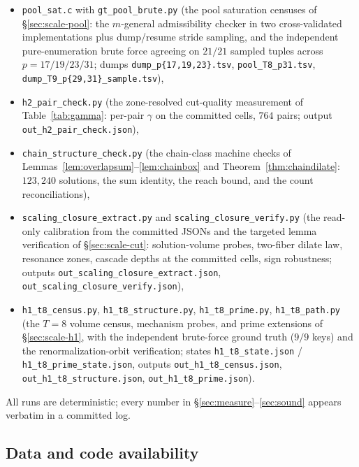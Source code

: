 \documentclass[11pt,a4paper]{article}
\numberwithin{equation}{section}
\theoremstyle{plain}
\theoremstyle{definition}
\theoremstyle{remark}
\begin{document}
\begin{itemize}[leftmargin=2.2em,itemsep=1pt,topsep=2pt]
        the two frontier cells; output
        \texttt{out\_higher\_rung\_step3.json}),
  \item \texttt{pool\_sat.c} with \texttt{gt\_pool\_brute.py} (the pool
        saturation censuses of \S\ref{sec:scale-pool}: the $m$-general
        admissibility checker in two cross-validated implementations
        plus dump/resume stride sampling, and the independent
        pure-enumeration brute force agreeing on $21/21$ sampled tuples
        across $p=17/19/23/31$; dumps
        \texttt{dump\_p\{17,19,23\}.tsv}, \texttt{pool\_T8\_p31.tsv},
        \texttt{dump\_T9\_p\{29,31\}\_sample.tsv}),
  \item \texttt{h2\_pair\_check.py} (the zone-resolved cut-quality
        measurement of Table~\ref{tab:gamma}: per-pair $\gamma$ on the
        committed cells, $764$ pairs; output
        \texttt{out\_h2\_pair\_check.json}),
  \item \texttt{chain\_structure\_check.py} (the chain-class machine
        checks of Lemmas~\ref{lem:overlapsum}--\ref{lem:chainbox} and
        Theorem~\ref{thm:chaindilate}: $123{,}240$ solutions, the sum
        identity, the reach bound, and the count reconciliations),
  \item \texttt{scaling\_closure\_extract.py} and
        \texttt{scaling\_closure\_verify.py} (the read-only calibration
        from the committed JSONs and the targeted lemma verification of
        \S\ref{sec:scale-cut}: solution-volume probes, two-fiber dilate
        law, resonance zones, cascade depths at the committed cells,
        sign robustness; outputs
        \texttt{out\_scaling\_closure\_extract.json},
        \texttt{out\_scaling\_closure\_verify.json}),
  \item \texttt{h1\_t8\_census.py}, \texttt{h1\_t8\_structure.py},
        \texttt{h1\_t8\_prime.py}, \texttt{h1\_t8\_path.py} (the
        $T=8$ volume census, mechanism probes, and prime extensions of
        \S\ref{sec:scale-h1}, with the independent brute-force ground
        truth ($9/9$ keys) and the renormalization-orbit verification;
        states \texttt{h1\_t8\_state.json} /
        \texttt{h1\_t8\_prime\_state.json}, outputs
        \texttt{out\_h1\_t8\_census.json},
        \texttt{out\_h1\_t8\_structure.json},
        \texttt{out\_h1\_t8\_prime.json}).
\end{itemize}
All runs are deterministic; every number in
\S\ref{sec:measure}--\ref{sec:sound} appears verbatim in a committed log.
\endgroup

\subsection{Data and code availability}
\end{document}
